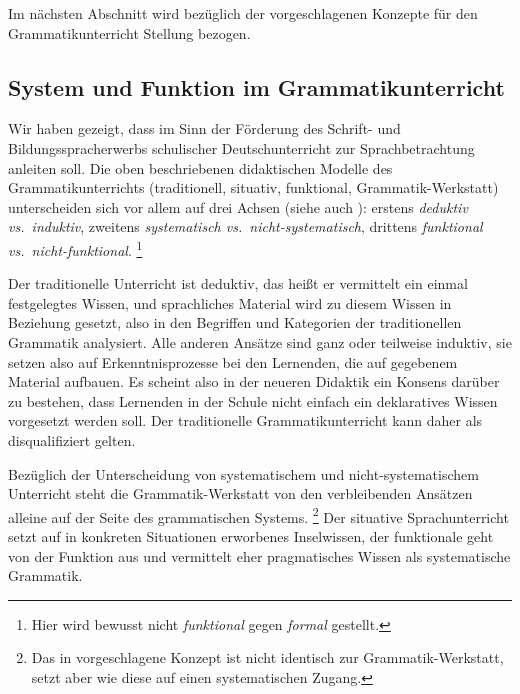 Im nächsten Abschnitt wird bezüglich der vorgeschlagenen Konzepte für den Grammatikunterricht Stellung bezogen.


\subsection{System und Funktion im Grammatikunterricht}
\label{sec:systemundfunktionimgrammatikunterricht}

Wir haben gezeigt, dass im Sinn der Förderung des Schrift- und Bildungsspracherwerbs schulischer Deutschunterricht zur Sprachbetrachtung anleiten soll.
Die oben beschriebenen didaktischen Modelle des Grammatikunterrichts (traditionell, situativ, funktional, Grammatik-Werkstatt) unterscheiden sich vor allem auf drei Achsen (siehe auch \citealt[8--9]{Menzel2017}):
erstens \textit{deduktiv vs.\ induktiv}, zweitens \textit{systematisch vs.\ nicht-systematisch}, drittens \textit{funktional vs.\ nicht-funktional}.%
\footnote{Hier wird bewusst nicht \textit{funktional} gegen \textit{formal} gestellt.}

Der traditionelle Unterricht ist deduktiv, das heißt er vermittelt ein einmal festgelegtes Wissen, und sprachliches Material wird zu diesem Wissen in Beziehung gesetzt, also in den Begriffen und Kategorien der traditionellen Grammatik analysiert.
Alle anderen Ansätze sind ganz oder teilweise induktiv, sie setzen also auf Erkenntnisprozesse bei den Lernenden, die auf gegebenem Material aufbauen.
Es scheint also in der neueren Didaktik ein Konsens darüber zu bestehen, dass Lernenden in der Schule nicht einfach ein deklaratives Wissen vorgesetzt werden soll.
Der traditionelle Grammatikunterricht kann daher als disqualifiziert gelten.

Bezüglich der Unterscheidung von systematischem und nicht-systematischem Unterricht steht die Grammatik-Werkstatt von den verbleibenden Ansätzen alleine auf der Seite des grammatischen Systems.%
\footnote{Das in \citet{Bredel2013} vorgeschlagene Konzept ist nicht identisch zur Grammatik-Werkstatt, setzt aber wie diese auf einen systematischen Zugang.}
Der situative Sprachunterricht setzt auf in konkreten Situationen erworbenes Inselwissen, der funktionale geht von der Funktion aus und vermittelt eher pragmatisches Wissen als systematische Grammatik.

